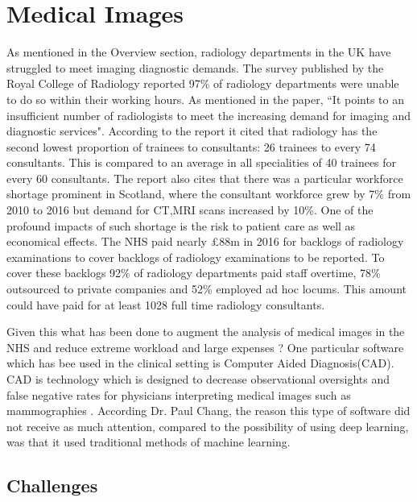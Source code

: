 \section{Medical Images}

As mentioned in the Overview section, radiology departments in the UK have struggled to meet imaging diagnostic demands. The survey published by the Royal College of Radiology reported 97\% of radiology departments were unable to do so within their working hours. As mentioned in the paper, ``It points to an insufficient number of radiologists to meet the increasing demand for imaging and diagnostic services". According to the report it cited that radiology has the second lowest proportion of trainees to consultants: 26 trainees to every 74 consultants. This is compared to an average in all specialities of 40 trainees for every 60 consultants. The report also cites that there was a particular workforce shortage prominent in Scotland, where the consultant workforce grew by 7\% from 2010 to 2016 but demand for CT,MRI scans increased by 10\%. 
One of the profound impacts of such shortage is the risk to patient care as well as economical effects. The NHS paid nearly £88m in 2016 for backlogs of radiology examinations to cover backlogs of radiology examinations to be reported. To cover these backlogs 92\% of radiology departments paid staff overtime, 78\% outsourced to private companies and 52\% employed ad hoc locums. This amount could have paid for at least 1028 full time radiology consultants.\cite{rimmer2017radiologist}

Given this what has been done to augment the analysis of medical images in the NHS and reduce extreme workload and large expenses ? One particular software which has bee used in the clinical setting is Computer Aided Diagnosis(CAD). CAD is technology which is designed to decrease observational oversights and false negative rates for physicians interpreting medical images such as mammographies \cite{castellino2005computer}. According Dr. Paul Chang, the reason this type of software did not receive as much attention, compared to the possibility of using deep learning, was that it used traditional methods of machine learning. \cite{youtube}

\subsection{Challenges}

